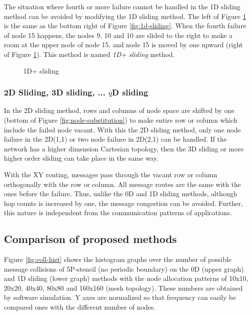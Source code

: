 \documentclass[10pt,conference,a4paper,fleqn]{IEEEtran}
\begin{document}
The situation where fourth or more failure cannot be handled in the 1D
sliding method can be avoided by modifying the 1D sliding method. The
left of Figure \ref{fig:1dp-sliding} is the same as the bottom right of
Figure \ref{fig:1d-sliding}. When the fourth failure of node 15
happens, the nodes 9, 10 and 10 are slided to the right to make a room
at the upper node of node 15, and node 15 is moved by one upward
(right of Figure \ref{fig:1dp-sliding}). This method is named {\it 1D+
  sliding} method. 

\begin{figure}[ht]
\begin{center}
  \caption{1D+ sliding} 
  \label{fig:1dp-sliding}
\end{center}
\end{figure}

\subsubsection{2D Sliding, 3D sliding, ... $q$D sliding}

In the 2D sliding method, rows and columns of node space are shifted by
one (bottom of Figure \ref{fig:node-substitution}) to make entire row
or column which include the failed node vacant. With this the 2D sliding
method, only one node failure in the 2D(1,1) or two node failure in
2D(2,1) can be handled. If the network has a higher dimension Cartesian
topology, then the 3D sliding or more higher order sliding can take place
in the same way.

With the XY routing, messages pass through the vacant row or
column orthogonally with the row or column. All message routes are the
same with the ones before the failure. Thus, unlike the 0D and 1D
sliding methods, although hop counts is increased by one, the message
congestion can be avoided. Further, this nature is independent from
the communication patterns of applications. 

\subsection{Comparison of proposed methods}\label{sec:comparison}

Figure \ref{fig:coll-hist} shows the histogram graphs over the number
of possible message collisions of 5P-stencil (no periodic boundary)
on the 0D (upper graph) and 1D sliding (lower graph) methods with the
node allocation patterns of 10x10, 20x20, 40x40, 80x80 and 160x160
(mesh topology). These numbers are obtained by software simulation. Y
axes are normalized so that frequency can easily be compared ones with
the different number of nodes. 
\end{document}
